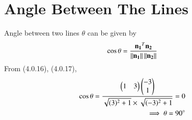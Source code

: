 \documentclass[journal,12pt,twocolumn]{IEEEtran}
\begin{document}
\section{Angle Between The Lines}
Angle between two lines $\theta$ can be given by
\begin{align}
\cos \theta = \frac{\mathbf{n_1}^T\mathbf{n_2}}{\left\lVert\mathbf{n_1}\right\rVert\left\lVert\mathbf{n_2}\right\rVert}
\end{align}
From (4.0.16), (4.0.17),
\begin{align}
\cos \theta=\frac{\begin{pmatrix}1&3\end{pmatrix}\begin{pmatrix}-3\\1\end{pmatrix}}{\sqrt{(3)^2 +1} \times \sqrt{(-3)^2 +1}}=0\\
\implies \theta = 90\degree
\end{align}
\end{document}
